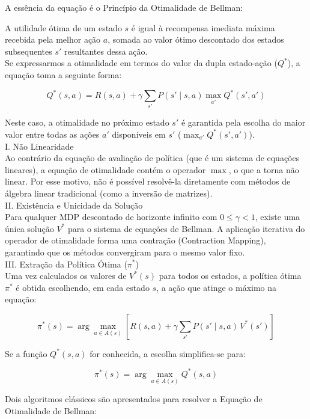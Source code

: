 \documentclass[a4paper,12pt]{article}
\begin{document}
A essência da equação é o Princípio da Otimalidade de Bellman:

A utilidade ótima de um estado $s$ é igual à recompensa imediata máxima recebida pela melhor ação $a$, somada ao valor ótimo descontado dos estados subsequentes $s'$ resultantes dessa ação.\\

Se expressarmos a otimalidade em termos do valor da dupla estado-ação ($Q^*$), a equação toma a seguinte forma:

$$Q^*(s, a) = R(s, a) + \gamma \sum_{s'} P(s' \mid s, a) \max_{a'} Q^*(s', a')$$

Neste caso, a otimalidade no próximo estado $s'$ é garantida pela escolha do maior valor entre todas as ações $a'$ disponíveis em $s'$ ($\max_{a'} Q^*(s', a')$).\\

I. Não Linearidade\\

Ao contrário da equação de avaliação de política (que é um sistema de equações lineares), a equação de otimalidade contém o operador $\max$, o que a torna não linear. Por esse motivo, não é possível resolvê-la diretamente com métodos de álgebra linear tradicional (como a inversão de matrizes).\\

II. Existência e Unicidade da Solução\\

Para qualquer MDP descontado de horizonte infinito com $0 \le \gamma < 1$, existe uma única solução $V^*$ para o sistema de equações de Bellman. A aplicação iterativa do operador de otimalidade forma uma contração (Contraction Mapping), garantindo que os métodos convergiram para o mesmo valor fixo.\\

III. Extração da Política Ótima ($\pi^*$)\\

Uma vez calculados os valores de $V^*(s)$ para todos os estados, a política ótima $\pi^*$ é obtida escolhendo, em cada estado $s$, a ação que atinge o máximo na equação:

$$\pi^*(s) = \arg\max_{a \in A(s)} \left[ R(s, a) + \gamma \sum_{s'} P(s' \mid s, a) \, V^*(s') \right]$$

Se a função $Q^*(s,a)$ for conhecida, a escolha simplifica-se para:

$$\pi^*(s) = \arg\max_{a \in A(s)} Q^*(s, a)$$

Dois algoritmos clássicos são apresentados para resolver a Equação de Otimalidade de Bellman:\\
\end{document}
